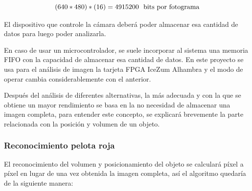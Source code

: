 \begin{equation}\label{eq:pixeles}
	(640*480)*(16) = 4915200  \ \ \textup{bits por fotograma} 
\end{equation}

El dispositivo que controle la cámara deberá poder almacenar esa cantidad de datos para luego poder analizarla. \newline

En caso de usar un microcontrolador, se suele incorporar al sistema una memoria FIFO con la capacidad de almacenar esa cantidad de datos. En este proyecto se usa para el análisis de imagen la tarjeta FPGA IceZum Alhambra y el modo de operar cambia considerablemente con el anterior.\newline

Después del análisis de diferentes alternativas, la más adecuada y con la que se obtiene un mayor rendimiento se basa en la no necesidad de almacenar una imagen completa, para entender este concepto, se explicará brevemente la parte relacionada con la posición y volumen de un objeto.

\subsubsection{Reconocimiento pelota roja}

El reconocimiento del volumen y posicionamiento del objeto se calculará píxel a píxel en lugar de una vez obtenida la imagen completa, así el algoritmo quedaría de la siguiente manera:

